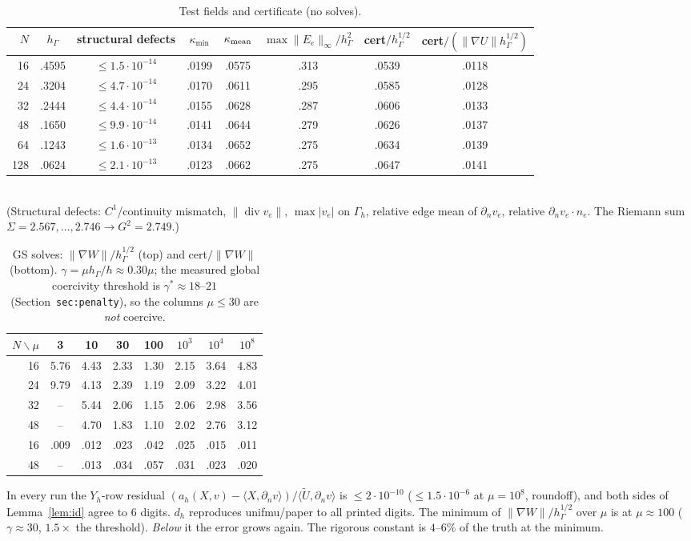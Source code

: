 \documentclass[11pt]{article}
\theoremstyle{remark}
\newcommand{\hG}{h_\Gamma}
\newcommand{\Gh}{\Gamma_h}
\newcommand{\Yh}{Y_h}
\newcommand{\norm}[1]{\|#1\|}
\newcommand{\ip}[2]{\langle #1,#2\rangle}
\newcommand{\dn}{\partial_n}
\newcommand{\Ut}{\tilde U}
\renewcommand{\div}{\operatorname{div}}
\begin{document}
\begin{table}[h]\centering\small
\caption{Test fields and certificate (no solves).}\label{tab:cert}
\begin{tabular}{rccccccc}
\toprule
$N$ & $\hG$ & structural defects & $\kappa_{\min}$ & $\kappa_{\rm mean}$ & $\max\norm{E_e}_\infty/\hG^2$ & cert$/\hG^{1/2}$ & cert$/(\norm{\nabla U}\hG^{1/2})$\\
\midrule
16 & .4595 & $\le1.5\cdot10^{-14}$ & .0199 & .0575 & .313 & .0539 & .0118\\
24 & .3204 & $\le4.7\cdot10^{-14}$ & .0170 & .0611 & .295 & .0585 & .0128\\
32 & .2444 & $\le4.4\cdot10^{-14}$ & .0155 & .0628 & .287 & .0606 & .0133\\
48 & .1650 & $\le9.9\cdot10^{-14}$ & .0141 & .0644 & .279 & .0626 & .0137\\
64 & .1243 & $\le1.6\cdot10^{-13}$ & .0134 & .0652 & .275 & .0634 & .0139\\
128 & .0624 & $\le2.1\cdot10^{-13}$ & .0123 & .0662 & .275 & .0647 & .0141\\
\bottomrule
\end{tabular}\\[2pt]
(Structural defects: $C^1$/continuity mismatch, $\norm{\div v_e}$, $\max|v_e|$ on $\Gh$, relative edge mean of $\dn v_e$, relative $\dn v_e\cdot n_e$. The Riemann sum $\Sigma=2.567,\dots,2.746\to G^2=2.749$.)
\end{table}

\begin{table}[h]\centering\small
\caption{GS solves: $\norm{\nabla W}/\hG^{1/2}$ (top) and cert$/\norm{\nabla W}$ (bottom). $\gamma=\mu\hG/h\approx0.30\mu$; the measured global coercivity threshold is $\gamma^\ast\approx18$--$21$ (Section~\texttt{sec:penalty}), so the columns $\mu\le30$ are \emph{not} coercive.}\label{tab:solve}
\begin{tabular}{r|ccccccc}
\toprule
$N\backslash\mu$ & 3 & 10 & 30 & 100 & $10^3$ & $10^4$ & $10^8$\\
\midrule
16 & 5.76 & 4.43 & 2.33 & 1.30 & 2.15 & 3.64 & 4.83\\
24 & 9.79 & 4.13 & 2.39 & 1.19 & 2.09 & 3.22 & 4.01\\
32 & -- & 5.44 & 2.06 & 1.15 & 2.06 & 2.98 & 3.56\\
48 & -- & 4.70 & 1.83 & 1.10 & 2.02 & 2.76 & 3.12\\
\midrule
16 & .009 & .012 & .023 & .042 & .025 & .015 & .011\\
48 & -- & .013 & .034 & .057 & .031 & .023 & .020\\
\bottomrule
\end{tabular}
\end{table}
In every run the $\Yh$-row residual $(a_h(X,v)-\ip X{\dn v})/\ip{\Ut}{\dn v}$ is $\le2\cdot10^{-10}$ ($\le1.5\cdot10^{-6}$ at $\mu=10^8$, roundoff), and both sides of Lemma~\ref{lem:id} agree to 6 digits. $d_h$ reproduces unifmu/paper to all printed digits. The minimum of $\norm{\nabla W}/\hG^{1/2}$ over $\mu$ is at $\mu\approx100$ ($\gamma\approx30$, $1.5\times$ the threshold). \emph{Below} it the error grows again. The rigorous constant is $4$--$6\%$ of the truth at the minimum.
\end{document}
